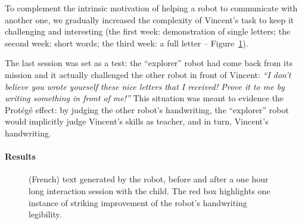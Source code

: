 \documentclass{article}
\begin{document}
To complement the intrinsic motivation of helping a robot to communicate with another one, we
gradually increased the complexity of Vincent's task to keep it challenging and
interesting (the first week: demonstration of single letters; the second week:
short words; the third week: a full letter -- Figure~\ref{fig:stimuli}).

The last session was set as a test: the ``explorer'' robot
had come back from its mission and it actually challenged the other robot in
front of Vincent: \emph{``I don't believe you wrote yourself these nice letters that I
received! Prove it to me by writing something in front of me!''} This situation
was meant to evidence the Protégé effect: by judging the other robot's
handwriting, the ``explorer'' robot would implicitly judge Vincent's skills as
teacher, and in turn, Vincent's handwriting.

\paragraph{Results}

\begin{figure}
    \centering

    \caption{\small (French) text generated by the robot, before and after a one
        hour long interaction session with the child. The red box
        highlights one instance of striking improvement of the robot's
        handwriting legibility.}

    \label{fig:stimuli}
\end{figure}
\end{document}

